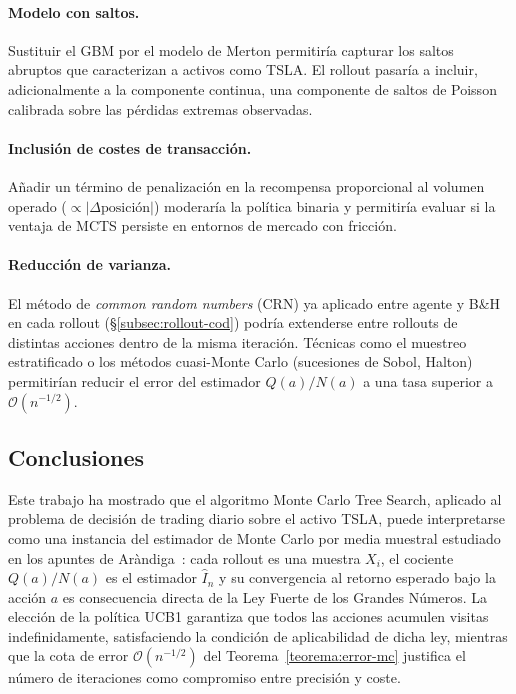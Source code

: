 \paragraph{Modelo con saltos.} Sustituir el GBM por el modelo de Merton permitiría capturar los saltos abruptos que caracterizan a activos como TSLA. El rollout pasaría a incluir, adicionalmente a la componente continua, una componente de saltos de Poisson calibrada sobre las pérdidas extremas observadas.

\paragraph{Inclusión de costes de transacción.} Añadir un término de penalización en la recompensa proporcional al volumen operado ($\propto |\Delta\text{posición}|$) moderaría la política binaria y permitiría evaluar si la ventaja de MCTS persiste en entornos de mercado con fricción.

\paragraph{Reducción de varianza.} El método de \emph{common random numbers} (CRN) ya aplicado entre agente y B\&H en cada rollout (§\ref{subsec:rollout-cod}) podría extenderse entre rollouts de distintas acciones dentro de la misma iteración. Técnicas como el muestreo estratificado o los métodos cuasi-Monte Carlo (sucesiones de Sobol, Halton) permitirían reducir el error del estimador $Q(a)/N(a)$ a una tasa superior a $\mathcal{O}(n^{-1/2})$.

\subsection{Conclusiones}
\label{subsec:conclusiones}

Este trabajo ha mostrado que el algoritmo Monte Carlo Tree Search, aplicado al problema de decisión de trading diario sobre el activo TSLA, puede interpretarse como una instancia del estimador de Monte Carlo por media muestral estudiado en los apuntes de Aràndiga~\cite{arandiga}: cada rollout es una muestra $X_i$, el cociente $Q(a)/N(a)$ es el estimador $\widehat{I}_n$ y su convergencia al retorno esperado bajo la acción $a$ es consecuencia directa de la Ley Fuerte de los Grandes Números. La elección de la política UCB1 garantiza que todos las acciones acumulen visitas indefinidamente, satisfaciendo la condición de aplicabilidad de dicha ley, mientras que la cota de error $\mathcal{O}(n^{-1/2})$ del Teorema~\ref{teorema:error-mc} justifica el número de iteraciones como compromiso entre precisión y coste.

